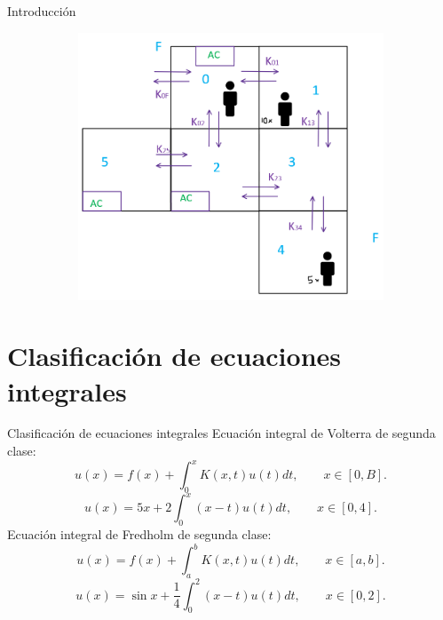 \documentclass{beamer}
\begin{document}
\begin{frame}{Introducción}
\begin{figure}
\begin{subfigure}[b]{0.3\textwidth}
		\end{subfigure}
		\begin{subfigure}[b]{0.4\textwidth}
			\includegraphics[width=\textwidth]{edificio_6habs}
		\end{subfigure}
	\end{figure}
\end{frame}
\section{Clasificación de ecuaciones integrales}
\begin{frame}{Clasificación de ecuaciones integrales}
	Ecuación integral de Volterra de segunda clase:
\begin{equation*}
	u(x) = f(x) + \int_0^x K(x,t)u(t)dt, \qquad x \in [0,B].
\end{equation*}
\begin{equation*}
	u(x) = 5x + 2\int_0^x (x-t)u(t)dt, \qquad x \in [0,4].
\end{equation*}
Ecuación integral de Fredholm de segunda clase:
\begin{equation*}
	u(x) = f(x) + \int_a^b K(x,t)u(t)dt, \qquad x \in [a,b].
\end{equation*}
\begin{equation*}
	u(x) = \sin x + \dfrac{1}{4}\int_{0}^2 (x-t)u(t)dt, \qquad x \in [0,2].
\end{equation*}
\end{frame}
\end{document}
